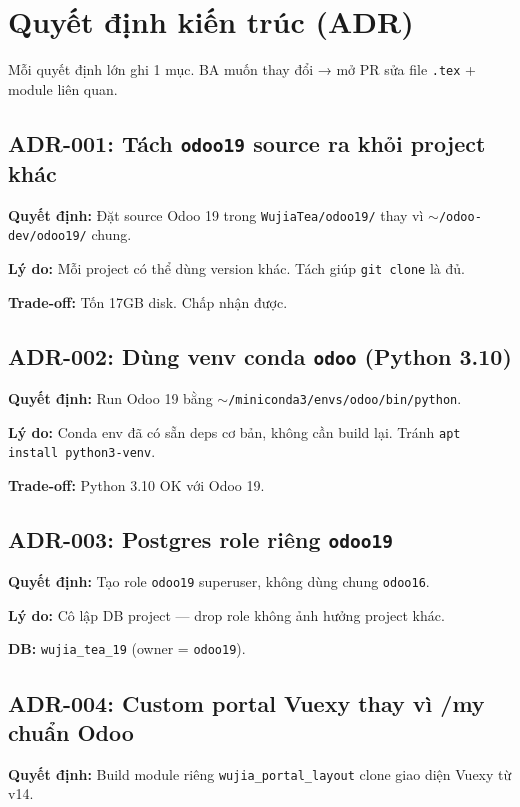 \chapter{Quyết định kiến trúc (ADR)}

Mỗi quyết định lớn ghi 1 mục. BA muốn thay đổi → mở PR sửa file \texttt{.tex} + module liên quan.

\section{ADR-001: Tách \texttt{odoo19} source ra khỏi project khác}

\textbf{Quyết định:} Đặt source Odoo 19 trong \texttt{WujiaTea/odoo19/} thay vì \texttt{$\sim$/odoo-dev/odoo19/} chung.

\textbf{Lý do:} Mỗi project có thể dùng version khác. Tách giúp \texttt{git clone} là đủ.

\textbf{Trade-off:} Tốn 17GB disk. Chấp nhận được.

\section{ADR-002: Dùng venv conda \texttt{odoo} (Python 3.10)}

\textbf{Quyết định:} Run Odoo 19 bằng \texttt{$\sim$/miniconda3/envs/odoo/bin/python}.

\textbf{Lý do:} Conda env đã có sẵn deps cơ bản, không cần build lại. Tránh \texttt{apt install python3-venv}.

\textbf{Trade-off:} Python 3.10 OK với Odoo 19.

\section{ADR-003: Postgres role riêng \texttt{odoo19}}

\textbf{Quyết định:} Tạo role \texttt{odoo19} superuser, không dùng chung \texttt{odoo16}.

\textbf{Lý do:} Cô lập DB project — drop role không ảnh hưởng project khác.

\textbf{DB:} \texttt{wujia\_tea\_19} (owner = \texttt{odoo19}).

\section{ADR-004: Custom portal Vuexy thay vì /my chuẩn Odoo}

\textbf{Quyết định:} Build module riêng \texttt{wujia\_portal\_layout} clone giao diện Vuexy từ v14.

